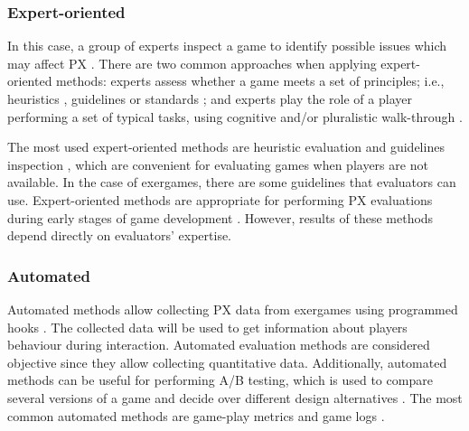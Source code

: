 \subsubsection{Expert-oriented}
In this case, a group of experts inspect a game to identify possible issues which may affect PX \autocite{Bernhaupt2015,Yanez-Gomez2017}. There are two common approaches when applying expert-oriented methods: experts assess whether a game meets a set of principles; i.e., heuristics \autocite{Yanez-Gomez2017,Wiemeyer2016,Nacke2015,desurvire_methods_2013,Nackea,Nacke2009,Desurvire2009}, guidelines or standards \autocite{Yanez-Gomez2017}; and experts play the role of a player performing a set of typical tasks, using cognitive and/or pluralistic walk-through \autocite{Yanez-Gomez2017}.

The most used expert-oriented methods are heuristic evaluation \autocite{Desurvire2009,Hochleitner2015,Tondello2016} and guidelines inspection \autocite{Yanez-Gomez2017}, which are convenient for evaluating games when players are not available. In the case of exergames, there are some guidelines \autocite{Wiemeyer2015,Pasch2009,Isbister2015,Mueller2014} that evaluators can use. Expert-oriented methods are appropriate for performing PX evaluations during early stages of game development \autocite{Bernhaupt2015,McAllister2015,desurvire_methods_2013}. However, results of these methods depend directly on evaluators’ expertise. 
    
\subsubsection{Automated}
Automated methods allow collecting \ac{PX} data from exergames using programmed hooks \autocite{Nacke2015}. The collected data will be used to get information about players behaviour during interaction. Automated evaluation methods are considered objective since they allow collecting quantitative data. Additionally, automated methods can be useful for performing A/B testing, which is used to compare several versions of a game and decide over different design alternatives \autocite{desurvire_methods_2013}. The most common automated methods are game-play metrics \autocite{Nacke2015} and game logs \autocite{Drachen2013,Wiemeyer2016}.
    
